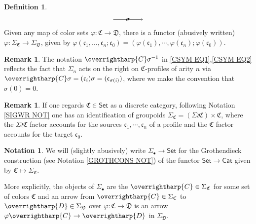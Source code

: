 \documentclass[a4paper,10pt
]{article}%
\numberwithin{equation}{section}
\numberwithin{figure}{section}
\theoremstyle{definition} %
\newtheorem{definition}[equation]{Definition}%
\newtheorem{remark}[equation]{Remark}%
\newtheorem{notation}[equation]{Notation}%
\newcommand{\vect}[1]{\text{\overrightharp{\ensuremath{#1}}}}
\newcommand{\1}{\ensuremath{\mathbbm 1}}%
\begin{document}
\begin{definition}
\begin{equation}
\begin{tikzpicture}
	\draw[->] (1.5,0.8) -- node{$\sigma$} (3,0.8);
	\end{tikzpicture}
	\end{equation}
	Given any map of color sets $\varphi \colon \mathfrak{C} \to \mathfrak{D}$,
	there is a functor (abusively written)
	$\varphi \colon \Sigma_{\mathfrak{C}} \to \Sigma_{\mathfrak{D}}$,
	given by 
	$\varphi (\mathfrak c_1, \dots, \mathfrak c_n; \mathfrak c_0) = (\varphi(\mathfrak c_1),\cdots,\varphi(\mathfrak c_n);\varphi(\mathfrak c_0))$. 
\end{definition}


\begin{remark}\label{GLOBSIG REM}
	The notation $\vect{C} \sigma^{-1}$
	in \eqref{CSYM EQ1},\eqref{CSYM EQ2}
	reflects the fact that $\Sigma_n$
	acts on the right on $\mathfrak{C}$-profiles of arity $n$
	via 
	$\vect{C} \sigma = (\mathfrak{c}_i)\sigma = 
	(\mathfrak{c}_{\sigma(i)})$,
	where we make the convention that $\sigma(0)=0$.
\end{remark}



\begin{remark}
	If one regards $\mathfrak{C} \in \mathsf{Set}$
	as a discrete category, 
	following Notation \ref{SIGWR NOT} one has an identification 
	of groupoids
	$\Sigma_{\mathfrak{C}} = (\Sigma \wr \mathfrak{C}) \times \mathfrak{C}$,
	where the 
	$\Sigma \wr \mathfrak{C}$ factor accounts for the sources
	$\mathfrak{c}_1,\cdots,\mathfrak{c}_n$ of a profile
	and the $\mathfrak{C}$ factor accounts for the target 
	$\mathfrak{c}_0$.
\end{remark}



\begin{notation}
	We will (slightly abusively) write
	$\Sigma_{\bullet} \to \mathsf{Set}$
	for the Grothendieck construction (see Notation \ref{GROTHCONS NOT})
	of the functor
	$\mathsf{Set} \to \mathsf{Cat}$ given by
	$\mathfrak{C} \mapsto \Sigma_{\mathfrak{C}}$.
	
	More explicitly, 
	the objects of $\Sigma_{\bullet}$
	are the $\vect{C} \in \Sigma_{\mathfrak{C}}$ 
	for some set of colors $\mathfrak{C}$
	and an arrow from
	$\vect{C} \in \Sigma_{\mathfrak{C}}$ to
	$\vect{D} \in \Sigma_{\mathfrak{D}}$
	over $\varphi \colon \mathfrak{C} \to \mathfrak{D}$
	is an arrow
	$\varphi \vect{C} \to \vect{D}$ in $\Sigma_{\mathfrak{D}}$.
\end{notation}
\end{document}
